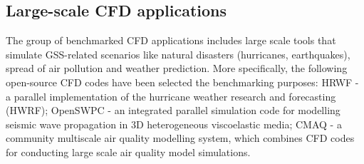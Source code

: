 
\subsection{Large-scale CFD applications}

The group of benchmarked CFD applications includes large scale tools that simulate GSS-related scenarios like natural disasters (hurricanes, earthquakes), spread of air pollution and weather prediction. More specifically, the following open-source CFD codes have been selected the benchmarking purposes: HRWF - a parallel implementation of the hurricane weather research and forecasting (HWRF); OpenSWPC - an integrated parallel simulation code for modelling seismic wave propagation in 3D heterogeneous viscoelastic media; CMAQ - a community multiscale air quality modelling system, which combines CFD codes for conducting large scale air quality model simulations.


